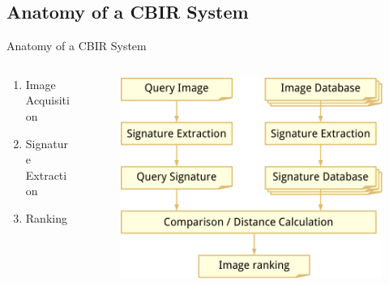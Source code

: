\documentclass[mathserif]{beamer}
\begin{document}
\subsection{Anatomy of a CBIR System}
\begin{frame}{Anatomy of a CBIR System}
    \begin{columns}
        \begin{column}{0.5\textwidth}
            \begin{enumerate}
                \item Image Acquisition
                \item Signature Extraction
                \item Ranking
            \end{enumerate}
        \end{column}
        \begin{column}{0.5\textwidth}
            \begin{figure}
                \includegraphics[width=.9\textwidth]{illustrations/cbir_anatomy_query_cropped}
            \end{figure}
        \end{column}
    \end{columns}
\end{frame}

\end{document}

